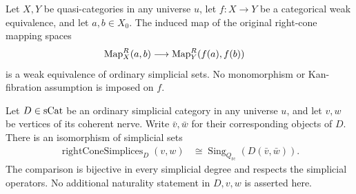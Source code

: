 \begin{resultblock}
\begin{theorem}
Let $X,Y$ be quasi-categories in any universe $u$, let $f:X\to Y$ be a
categorical weak equivalence, and let $a,b\in X_0$.
The induced map of the original right-cone mapping spaces
\begin{align}
 \operatorname{Map}^{R}_{X}(a,b)
  &\longrightarrow \operatorname{Map}^{R}_{Y}(f(a),f(b))
\end{align}
is a weak equivalence of ordinary simplicial sets.
No monomorphism or Kan-fibration assumption is imposed on $f$.
\end{theorem}
\end{resultblock}

\begin{resultblock}
\begin{theorem}
Let $D\in\mathrm{sCat}$ be an ordinary simplicial category in any universe $u$,
and let $v,w$ be vertices of its coherent nerve.
Write $\bar v,\bar w$ for their corresponding objects of $D$.
There is an isomorphism of simplicial sets
\begin{align}
 \operatorname{rightConeSimplices}_{D}(v,w)
  &\cong \operatorname{Sing}_{Q_{\mathrm{rc}}}(D(\bar v,\bar w)).
\end{align}
The comparison is bijective in every simplicial degree and respects the
simplicial operators.
No additional naturality statement in $D,v,w$ is asserted here.
\end{theorem}
\end{resultblock}
